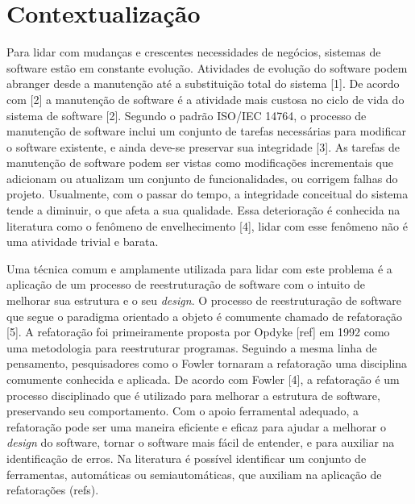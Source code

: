 
\section{Contextualização}\label{sec:contexto}


Para lidar com mudanças e crescentes necessidades de negócios, sistemas de software estão em constante evolução. Atividades de evolução do software podem abranger desde a manutenção até a substituição total do sistema [1]. De acordo com [2] a manutenção de software é a atividade mais custosa no ciclo de vida do sistema de software [2]. Segundo o padrão ISO/IEC 14764, o processo de manutenção de software inclui um conjunto de tarefas necessárias para modificar o software existente, e ainda deve-se preservar sua integridade [3]. As tarefas de manutenção de software podem ser vistas como modificações incrementais que adicionam ou atualizam um conjunto de funcionalidades, ou corrigem falhas do projeto. Usualmente, com o passar do tempo, a integridade conceitual do sistema tende a diminuir, o que afeta a sua qualidade. Essa deterioração é conhecida na literatura como o fenômeno de envelhecimento [4], lidar com esse fenômeno não é uma atividade trivial e barata.

Uma técnica comum e amplamente utilizada para lidar com este problema é a aplicação de um processo de reestruturação de software com o intuito de melhorar sua estrutura e o seu \emph{design}. O processo de reestruturação de software que segue o paradigma orientado a objeto é comumente chamado de refatoração [5]. A refatoração foi primeiramente proposta por Opdyke [ref] em 1992 como uma metodologia para reestruturar programas. Seguindo a mesma linha de pensamento, pesquisadores como o Fowler tornaram a refatoração uma disciplina comumente conhecida e aplicada. De acordo com Fowler [4], a refatoração é um processo disciplinado que é utilizado para melhorar a estrutura de software, preservando seu comportamento. Com o apoio ferramental adequado, a refatoração pode ser uma maneira eficiente e eficaz para ajudar a melhorar o \emph{design} do software, tornar o software mais fácil de entender, e para auxiliar na identificação de erros. Na literatura é possível identificar um conjunto de ferramentas, automáticas ou semiautomáticas, que auxiliam na aplicação de refatorações (refs). 


